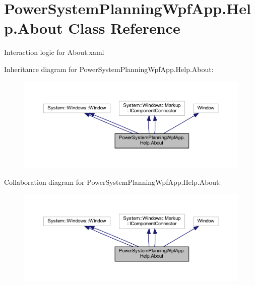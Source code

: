 \hypertarget{class_power_system_planning_wpf_app_1_1_help_1_1_about}{}\section{Power\+System\+Planning\+Wpf\+App.\+Help.\+About Class Reference}
\label{class_power_system_planning_wpf_app_1_1_help_1_1_about}


Interaction logic for About.\+xaml  




Inheritance diagram for Power\+System\+Planning\+Wpf\+App.\+Help.\+About\+:\nopagebreak
\begin{figure}[H]
\begin{center}
\leavevmode
\includegraphics[width=350pt]{class_power_system_planning_wpf_app_1_1_help_1_1_about__inherit__graph}
\end{center}
\end{figure}


Collaboration diagram for Power\+System\+Planning\+Wpf\+App.\+Help.\+About\+:\nopagebreak
\begin{figure}[H]
\begin{center}
\leavevmode
\includegraphics[width=350pt]{class_power_system_planning_wpf_app_1_1_help_1_1_about__coll__graph}
\end{center}
\end{figure}
